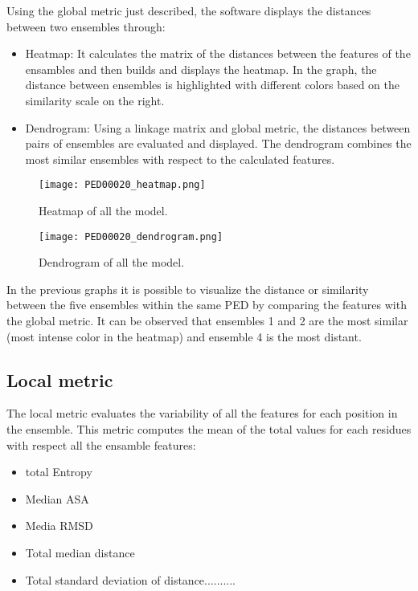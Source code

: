 Using the global metric just described, the software displays the distances between two ensembles through:
\begin{itemize}
\item Heatmap: It calculates the matrix of the distances between the features of the ensambles and then builds and displays the heatmap. In the graph, the distance between ensembles is highlighted with different colors based on the similarity scale on the right. 
\item Dendrogram: Using a linkage matrix and global metric, the distances between pairs of ensembles are evaluated and displayed. The dendrogram combines the most similar ensembles with respect to the calculated features.
\end{itemize}

\begin{figure}[H]
	\begin{minipage}[b]{0.9\textwidth}
		\centering
		\texttt{[image: PED00020\_heatmap.png]}
		\caption{Heatmap of all the model.}
		\label{heatmap}
	\end{minipage}
	\hfill
	\begin{minipage}[b]{0.9\textwidth}
		\centering
		\texttt{[image: PED00020\_dendrogram.png]}
		\caption{Dendrogram of all the model.}
		\label{dendrogram}
	\end{minipage}
\end{figure}

In the previous graphs it is possible to visualize the distance or similarity between the five ensembles within the same PED by comparing the features with the global metric. It can be observed that ensembles 1 and 2 are the most similar (most intense color in the heatmap) and ensemble 4 is the most distant.


\subsection{Local metric}
The local metric evaluates the variability of all the features for each position in the ensemble.
This metric computes the mean of the total values for each residues with respect all the ensamble features:
\begin{itemize}
\item total Entropy
\item Median ASA
\item Media RMSD
\item Total median distance
\item Total standard deviation of distance.......... 
\end{itemize}

